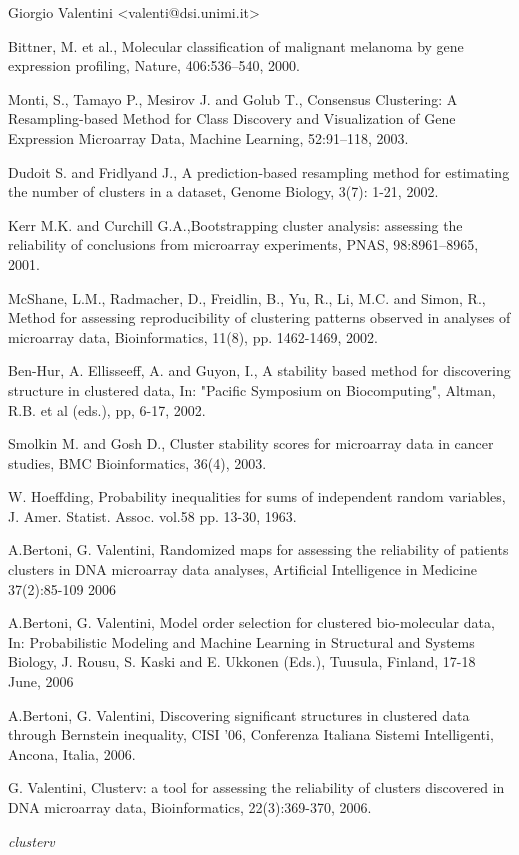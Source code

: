 \documentclass{article}
\begin{document}
\begin{Author}\relax
Giorgio Valentini <valenti@dsi.unimi.it>
\end{Author}
\begin{References}\relax
Bittner, M. et al., Molecular classification of malignant melanoma by gene expression profiling, Nature, 406:536--540, 2000.

Monti, S.,  Tamayo P.,  Mesirov J. and Golub T., Consensus Clustering: A Resampling-based Method for Class Discovery and Visualization of Gene
Expression Microarray Data, Machine Learning, 52:91--118, 2003.

Dudoit S. and Fridlyand J., A prediction-based resampling method for estimating the number of clusters in a dataset, Genome Biology,
3(7): 1-21, 2002.

Kerr M.K. and Curchill G.A.,Bootstrapping cluster analysis: assessing the reliability of conclusions from microarray experiments,
PNAS, 98:8961--8965, 2001.

McShane, L.M., Radmacher, D., Freidlin, B., Yu, R.,  Li, M.C. and Simon, R.,
Method for assessing reproducibility of clustering patterns observed in analyses of microarray data,
Bioinformatics, 11(8), pp. 1462-1469, 2002.

Ben-Hur, A. Ellisseeff, A. and Guyon, I., A stability based method for discovering structure in clustered data,
In: "Pacific Symposium on Biocomputing", Altman, R.B. et al (eds.), pp, 6-17, 2002.

Smolkin M. and Gosh D., Cluster stability scores for microarray data in cancer studies, BMC Bioinformatics,
36(4), 2003.

W. Hoeffding, Probability inequalities for sums of independent random variables, J. Amer. Statist. Assoc. vol.58 pp. 13-30, 1963.

A.Bertoni, G. Valentini, Randomized maps for assessing the reliability of patients clusters in DNA microarray data analyses, 
Artificial Intelligence in Medicine 37(2):85-109  2006

A.Bertoni, G. Valentini, Model order selection for clustered bio-molecular data,  
In: Probabilistic Modeling and Machine Learning in Structural and Systems Biology, J. Rousu, S. Kaski and E. Ukkonen (Eds.), 
Tuusula, Finland, 17-18 June,  2006

A.Bertoni, G. Valentini, Discovering significant structures in clustered data through Bernstein inequality, 
CISI '06, Conferenza Italiana Sistemi Intelligenti, Ancona, Italia, 2006.

G. Valentini, Clusterv: a tool for assessing the reliability of clusters discovered in DNA microarray data, Bioinformatics,
22(3):369-370, 2006.
\end{References}
\begin{SeeAlso}\relax
\emph{clusterv}
\end{SeeAlso}
\end{document}
